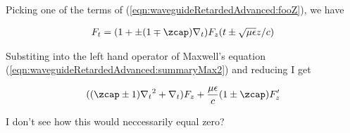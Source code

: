 Picking one of the terms of (\ref{eqn:waveguideRetardedAdvanced:fooZ}), we have

\begin{align*}
F_t = (1 + \pm (1 \mp \zcap) \grad_t) F_z(t \pm \sqrt{\mu\epsilon} z/c) 
\end{align*}

Substiting into the left hand operator of Maxwell's equation (\ref{eqn:waveguideRetardedAdvanced:summaryMax2}) and reducing I get

\begin{align*}
((\zcap \pm 1) {\grad_t}^2 + \grad_t) F_z + \frac{\mu\epsilon}{c}(1 \pm \zcap) F_z'
\end{align*}

I don't see how this would neccessarily equal zero?

\EndArticle
